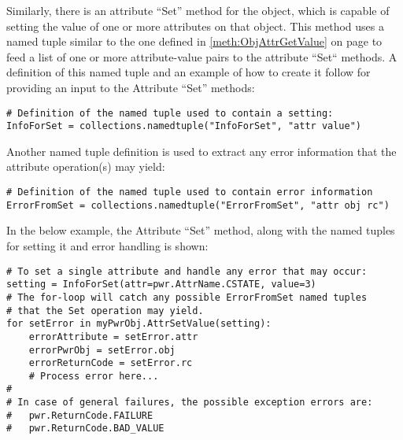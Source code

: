\documentclass[12pt]{report} %
\begin{document}
\begin{appendices}
Similarly, there is an attribute ``Set'' method for the object, which is capable
of setting the value of one or more attributes on that object. This method
uses a named tuple similar to the one defined in
\ref{meth:ObjAttrGetValue} on page \pageref{meth:ObjAttrGetValue} to feed a
list of one or more attribute-value pairs to the attribute ``Set`` methods. A
definition of this named tuple and an example of how to create it follow for
providing an input to the Attribute ``Set'' methods:

\begin{center}\begin{minipage}{.95\linewidth}\begin{lstlisting}
# Definition of the named tuple used to contain a setting:
InfoForSet = collections.namedtuple("InfoForSet", "attr value")
\end{lstlisting}\end{minipage}\end{center}

Another named tuple definition is used to extract any error information
that the attribute operation(s) may yield:

\begin{center}\begin{minipage}{.95\linewidth}\begin{lstlisting}
# Definition of the named tuple used to contain error information
ErrorFromSet = collections.namedtuple("ErrorFromSet", "attr obj rc")
\end{lstlisting}\end{minipage}\end{center}

In the below example, the Attribute ``Set'' method, along with the named tuples for setting it and error handling is shown:

\begin{center}\begin{minipage}{.95\linewidth}\begin{lstlisting}
# To set a single attribute and handle any error that may occur:
setting = InfoForSet(attr=pwr.AttrName.CSTATE, value=3)
# The for-loop will catch any possible ErrorFromSet named tuples
# that the Set operation may yield.
for setError in myPwrObj.AttrSetValue(setting):
    errorAttribute = setError.attr
    errorPwrObj = setError.obj
    errorReturnCode = setError.rc
    # Process error here...
#
# In case of general failures, the possible exception errors are:
#   pwr.ReturnCode.FAILURE
#   pwr.ReturnCode.BAD_VALUE
\end{lstlisting}\end{minipage}\end{center}


\end{appendices}
\end{document}
